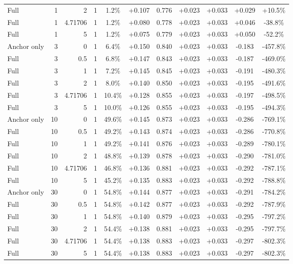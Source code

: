 \begin{table}[htbp]
\begin{tabular}{lrrrccccccc}
Full & 1 & 2 & 1 & 1.2\% & +0.107 & 0.776 & +0.023 & +0.033 & +0.029 & +10.5\% \\
Full & 1 & 4.71706 & 1 & 1.2\% & +0.080 & 0.778 & +0.023 & +0.033 & +0.046 & -38.8\% \\
Full & 1 & 5 & 1 & 1.2\% & +0.075 & 0.779 & +0.023 & +0.033 & +0.050 & -52.2\% \\
Anchor only & 3 & 0 & 1 & 6.4\% & +0.150 & 0.840 & +0.023 & +0.033 & -0.183 & -457.8\% \\
Full & 3 & 0.5 & 1 & 6.8\% & +0.147 & 0.843 & +0.023 & +0.033 & -0.187 & -469.0\% \\
Full & 3 & 1 & 1 & 7.2\% & +0.145 & 0.845 & +0.023 & +0.033 & -0.191 & -480.3\% \\
Full & 3 & 2 & 1 & 8.0\% & +0.140 & 0.850 & +0.023 & +0.033 & -0.195 & -491.6\% \\
Full & 3 & 4.71706 & 1 & 10.4\% & +0.128 & 0.855 & +0.023 & +0.033 & -0.197 & -498.5\% \\
Full & 3 & 5 & 1 & 10.0\% & +0.126 & 0.855 & +0.023 & +0.033 & -0.195 & -494.3\% \\
Anchor only & 10 & 0 & 1 & 49.6\% & +0.145 & 0.873 & +0.023 & +0.033 & -0.286 & -769.1\% \\
Full & 10 & 0.5 & 1 & 49.2\% & +0.143 & 0.874 & +0.023 & +0.033 & -0.286 & -770.8\% \\
Full & 10 & 1 & 1 & 49.2\% & +0.141 & 0.876 & +0.023 & +0.033 & -0.289 & -780.1\% \\
Full & 10 & 2 & 1 & 48.8\% & +0.139 & 0.878 & +0.023 & +0.033 & -0.290 & -781.0\% \\
Full & 10 & 4.71706 & 1 & 46.8\% & +0.136 & 0.881 & +0.023 & +0.033 & -0.292 & -787.1\% \\
Full & 10 & 5 & 1 & 45.2\% & +0.135 & 0.883 & +0.023 & +0.033 & -0.292 & -788.8\% \\
Anchor only & 30 & 0 & 1 & 54.8\% & +0.144 & 0.877 & +0.023 & +0.033 & -0.291 & -784.2\% \\
Full & 30 & 0.5 & 1 & 54.8\% & +0.142 & 0.877 & +0.023 & +0.033 & -0.292 & -787.9\% \\
Full & 30 & 1 & 1 & 54.8\% & +0.140 & 0.879 & +0.023 & +0.033 & -0.295 & -797.2\% \\
Full & 30 & 2 & 1 & 54.4\% & +0.138 & 0.881 & +0.023 & +0.033 & -0.295 & -797.7\% \\
Full & 30 & 4.71706 & 1 & 54.4\% & +0.138 & 0.883 & +0.023 & +0.033 & -0.297 & -802.3\% \\
Full & 30 & 5 & 1 & 54.4\% & +0.138 & 0.883 & +0.023 & +0.033 & -0.297 & -802.3\% \\

\end{tabular}
\end{table}
